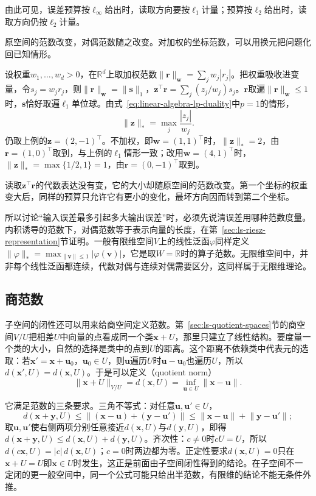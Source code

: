由此可见，误差预算按$\ell_\infty$给出时，读取方向要按$\ell_1$计量；预算按$\ell_2$给出时，读取方向仍按$\ell_2$计量。

原空间的范数改变，对偶范数随之改变。对加权的坐标范数，可以用换元把问题化回已知情形。
\begin{example}
\label{ex:ls-weighted-dual-norm}
设权重$w_1,\ldots,w_d>0$，在$\mathbb R^d$上取加权范数$\lVert\bm r\rVert_{\bm w}=\sum_jw_j|r_j|$。把权重吸收进变量，令$s_j=w_jr_j$，则$\lVert\bm r\rVert_{\bm w}=\lVert\bm s\rVert_1$，$\bm z^\top\bm r=\sum_j(z_j/w_j)s_j$。$\bm r$取遍$\lVert\bm r\rVert_{\bm w}\leq1$时，$\bm s$恰好取遍$\ell_1$单位球。由式~\eqref{eq:linear-algebra-lp-duality}中$p=1$的情形，
\[
 \lVert\bm z\rVert_*=\max_j\frac{|z_j|}{w_j}.
\]
仍取上例的$\bm z=(2,-1)^\top$。不加权，即$\bm w=(1,1)^\top$时，$\lVert\bm z\rVert_*=2$，由$\bm r=(1,0)^\top$取到，与上例的$\ell_1$情形一致；改用$\bm w=(4,1)^\top$时，$\lVert\bm z\rVert_*=\max\{1/2,1\}=1$，由$\bm r=(0,-1)^\top$取到。

读取$\bm z^\top\bm r$的代数表达没有变，它的大小却随原空间的范数改变。第一个坐标的权重变大后，同样的预算只允许它有更小的变化，最坏方向因而转到第二个坐标。
\end{example}
所以讨论“输入误差最多引起多大输出误差”时，必须先说清误差用哪种范数度量。内积诱导的范数下，对偶范数等于表示向量的长度，在第~\ref{sec:ls-riesz-representation}节证明。一般有限维空间$V$上的线性泛函$\varphi$同样定义$\lVert\varphi\rVert_*=\max_{\lVert\bm v\rVert\leq1}|\varphi(\bm v)|$，它是取$W=\mathbb R$时的算子范数。无限维空间中，并非每个线性泛函都连续，代数对偶与连续对偶需要区分，这同样属于无限维理论。

\subsection{商范数}
\label{sec:ls-quotient-norms}

子空间的闭性还可以用来给商空间定义范数。第~\ref{sec:ls-quotient-spaces}节的商空间$V/U$把相差$U$中向量的点看成同一个类$\bm x+U$，那里只建立了线性结构。要度量一个类的大小，自然的选择是类中的点到$U$的距离。这个距离不依赖类中代表元的选取：若$\bm x'=\bm x+\bm u_0$，$\bm u_0\in U$，则$\bm u$遍历$U$时$\bm u-\bm u_0$也遍历$U$，所以$d(\bm x',U)=d(\bm x,U)$。于是可以定义（quotient norm）
\[
 \lVert\bm x+U\rVert_{V/U}=d(\bm x,U)=\inf_{\bm u\in U}\lVert\bm x-\bm u\rVert .
\]

它满足范数的三条要求。三角不等式：对任意$\bm u,\bm u'\in U$，
\[
 d(\bm x+\bm y,U)\leq\lVert(\bm x-\bm u)+(\bm y-\bm u')\rVert\leq\lVert\bm x-\bm u\rVert+\lVert\bm y-\bm u'\rVert;
\]
取$\bm u,\bm u'$使右侧两项分别任意接近$d(\bm x,U)$与$d(\bm y,U)$，即得$d(\bm x+\bm y,U)\leq d(\bm x,U)+d(\bm y,U)$。齐次性：$c\neq0$时$cU=U$，所以$d(c\bm x,U)=|c|\,d(\bm x,U)$；$c=0$时两边都为零。正定性要求$d(\bm x,U)=0$只在$\bm x+U=U$即$\bm x\in U$时发生，这正是前面由子空间闭性得到的结论。在子空间不一定闭的更一般空间中，同一个公式可能只给出半范数，有限维的结论不能无条件外推。

